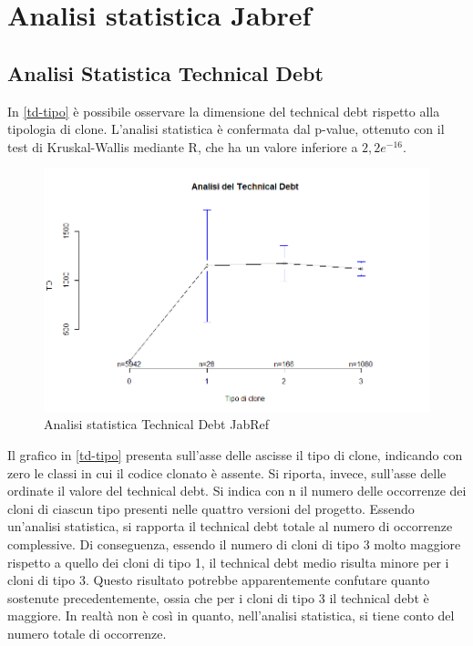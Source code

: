 \section{Analisi statistica Jabref}

\subsection{Analisi Statistica Technical Debt}
In \autoref{td-tipo} è possibile osservare la dimensione del technical debt rispetto alla tipologia di clone. L'analisi statistica è confermata dal p-value, ottenuto con il test di Kruskal-Wallis mediante R, che ha un valore inferiore a $2,2 e^{-16}$.
\begin{figure}[htbp]
	\centering
	\includegraphics[scale=0.5]{analisi_R/AnalisiJabref/1-gplot-td-type.png}
\caption{Analisi statistica Technical Debt JabRef}
\label{td-tipo}
\end{figure}

Il grafico in \autoref{td-tipo} presenta sull'asse delle ascisse il tipo di clone, indicando con zero le classi in cui il codice clonato è assente. Si riporta, invece, sull'asse delle ordinate il valore del technical debt. Si indica con n il numero delle occorrenze dei cloni di ciascun tipo presenti nelle quattro versioni del progetto. Essendo un'analisi statistica, si rapporta il technical debt totale al numero di occorrenze complessive. Di conseguenza, essendo il numero di cloni di tipo 3 molto maggiore rispetto a quello dei cloni di tipo 1, il technical debt medio risulta minore per i cloni di tipo 3. Questo risultato potrebbe apparentemente confutare quanto sostenute precedentemente, ossia che per i cloni di tipo 3 il technical debt è maggiore. In realtà non è così in quanto, nell'analisi statistica, si tiene conto del numero totale di occorrenze.

